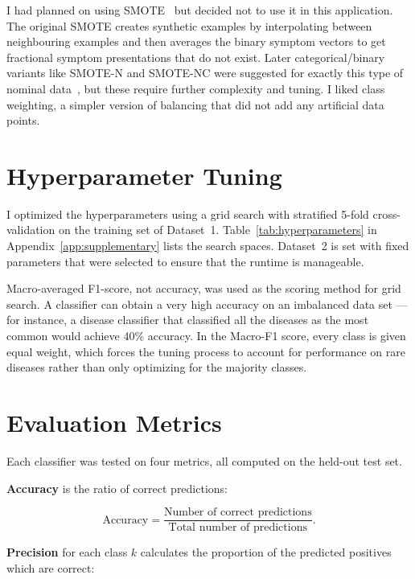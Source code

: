 I had planned on using SMOTE~\citep{Chawla2002} but decided not to use it in this application. The original SMOTE creates synthetic examples by interpolating between neighbouring examples and then averages the binary symptom vectors to get fractional symptom presentations that do not exist. Later categorical/binary variants like SMOTE-N and SMOTE-NC were suggested for exactly this type of nominal data~\citep{Fernandez2018}, but these require further complexity and tuning. I liked class weighting, a simpler version of balancing that did not add any artificial data points.

\section{Hyperparameter Tuning}
\label{sec:hyperparameter_tuning}

I optimized the hyperparameters using a grid search with stratified 5-fold cross-validation on the training set of Dataset~1. Table~\ref{tab:hyperparameters} in Appendix~\ref{app:supplementary} lists the search spaces. Dataset~2 is set with fixed parameters that were selected to ensure that the runtime is manageable.

Macro-averaged F1-score, not accuracy, was used as the scoring method for grid search. A classifier can obtain a very high accuracy on an imbalanced data set --- for instance, a disease classifier that classified all the diseases as the most common would achieve 40\% accuracy. In the Macro-F1 score, every class is given equal weight, which forces the tuning process to account for performance on rare diseases rather than only optimizing for the majority classes.

\section{Evaluation Metrics}
\label{sec:evaluation_metrics}

Each classifier was tested on four metrics, all computed on the held-out test set.

\textbf{Accuracy} is the ratio of correct predictions:

\begin{equation}
\label{eq:accuracy}
\text{Accuracy} = \frac{\text{Number of correct predictions}}{\text{Total number of predictions}}.
\end{equation}

\textbf{Precision} for each class $k$ calculates the proportion of the predicted positives which are correct:

